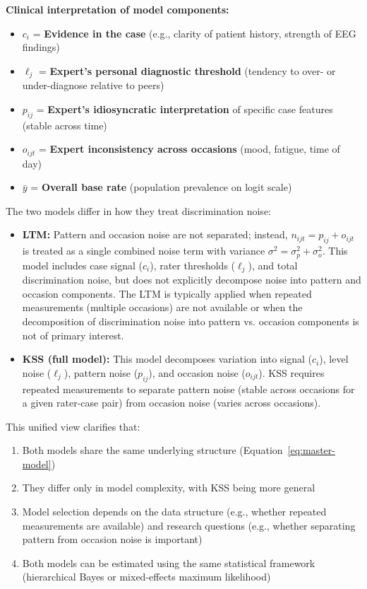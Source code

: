 \textbf{Clinical interpretation of model components:}
\begin{itemize}
    \item $c_i$ = \textbf{Evidence in the case} (e.g., clarity of patient history, strength of EEG findings)
    \item $\ell_j$ = \textbf{Expert's personal diagnostic threshold} (tendency to over- or under-diagnose relative to peers)
    \item $p_{ij}$ = \textbf{Expert's idiosyncratic interpretation} of specific case features (stable across time)
    \item $o_{ijt}$ = \textbf{Expert inconsistency across occasions} (mood, fatigue, time of day)
    \item $\bar{y}$ = \textbf{Overall base rate} (population prevalence on logit scale)
\end{itemize}

The two models differ in how they treat discrimination noise:

\begin{itemize}
    \item \textbf{LTM:} Pattern and occasion noise are not separated; instead, $n_{ijt} = p_{ij} + o_{ijt}$ is treated as a single combined noise term with variance $\sigma^2 = \sigma_p^2 + \sigma_o^2$. This model includes case signal ($c_i$), rater thresholds ($\ell_j$), and total discrimination noise, but does not explicitly decompose noise into pattern and occasion components. The LTM is typically applied when repeated measurements (multiple occasions) are not available or when the decomposition of discrimination noise into pattern vs. occasion components is not of primary interest.

    \item \textbf{KSS (full model):} This model decomposes variation into signal ($c_i$), level noise ($\ell_j$), pattern noise ($p_{ij}$), and occasion noise ($o_{ijt}$). KSS requires repeated measurements to separate pattern noise (stable across occasions for a given rater-case pair) from occasion noise (varies across occasions).
\end{itemize}

This unified view clarifies that:
\begin{enumerate}
    \item Both models share the same underlying structure (Equation~\ref{eq:master-model})
    \item They differ only in model complexity, with KSS being more general
    \item Model selection depends on the data structure (e.g., whether repeated measurements are available) and research questions (e.g., whether separating pattern from occasion noise is important)
    \item Both models can be estimated using the same statistical framework (hierarchical Bayes or mixed-effects maximum likelihood)
\end{enumerate}

